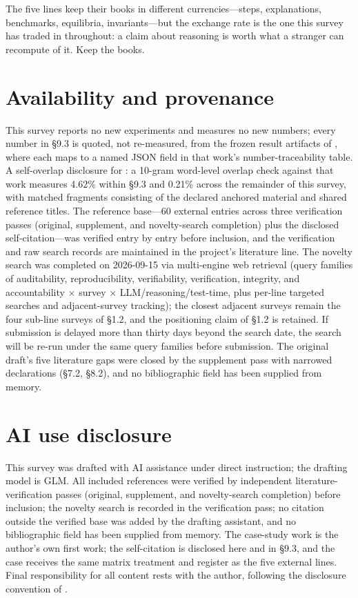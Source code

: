 \documentclass[11pt,a4paper]{article}
\begin{document}
The five lines keep their books in different currencies—steps, explanations, benchmarks, equilibria, invariants—but the exchange rate is the one this survey has traded in throughout: a claim about reasoning is worth what a stranger can recompute of it. Keep the books.

\section*{Availability and provenance}

This survey reports no new experiments and measures no new numbers; every number in §9.3 is quoted, not re-measured, from the frozen result artifacts of \cite{key04}, where each maps to a named JSON field in that work's number-traceability table. A self-overlap disclosure for \cite{key04}: a 10-gram word-level overlap check against that work measures 4.62\% within §9.3 and 0.21\% across the remainder of this survey, with matched fragments consisting of the declared anchored material and shared reference titles. The reference base—60 external entries across three verification passes (original, supplement, and novelty-search completion) plus the disclosed self-citation—was verified entry by entry before inclusion, and the verification and raw search records are maintained in the project's literature line. The novelty search was completed on 2026-09-15 via multi-engine web retrieval (query families of auditability, reproducibility, verifiability, verification, integrity, and accountability × survey × LLM/reasoning/test-time, plus per-line targeted searches and adjacent-survey tracking); the closest adjacent surveys remain the four sub-line surveys of §1.2, and the positioning claim of §1.2 is retained. If submission is delayed more than thirty days beyond the search date, the search will be re-run under the same query families before submission. The original draft's five literature gaps were closed by the supplement pass with narrowed declarations (§7.2, §8.2), and no bibliographic field has been supplied from memory.

\section*{AI use disclosure}

This survey was drafted with AI assistance under direct instruction; the drafting model is GLM. All included references were verified by independent literature-verification passes (original, supplement, and novelty-search completion) before inclusion; the novelty search is recorded in the verification pass; no citation outside the verified base was added by the drafting assistant, and no bibliographic field has been supplied from memory. The case-study work \cite{key04} is the author's own first work; the self-citation is disclosed here and in §9.3, and the case receives the same matrix treatment and register as the five external lines. Final responsibility for all content rests with the author, following the disclosure convention of \cite{key04}.
\end{document}
